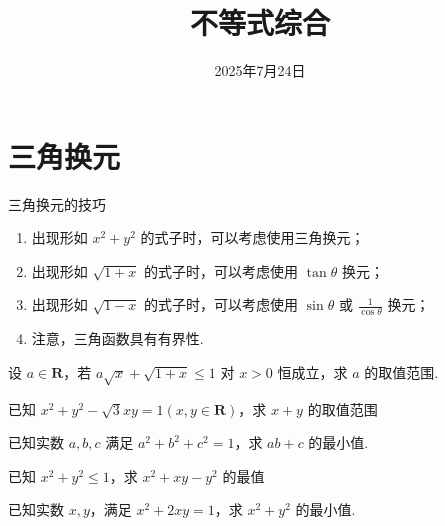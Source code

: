 \documentclass[a4paper , final]{ctexart}
\title{不等式综合}
\date{2025年7月24日}
\newenvironment{problem}[1]{%
  \item #1
  \par
  \vspace{8cm}
}{}
\begin{document}
\maketitle

\section*{三角换元}

三角换元的技巧
\begin{enumerate}
  \item 出现形如 $x^2+y^2$ 的式子时，可以考虑使用三角换元；
  \item 出现形如 $\sqrt{1+x}$ 的式子时，可以考虑使用 $\tan\theta$ 换元；
  \item 出现形如 $\sqrt{1-x}$ 的式子时，可以考虑使用 $\sin\theta$ 或 $\frac{1}{\cos\theta}$ 换元；
  \item  注意，三角函数具有有界性.
\end{enumerate}

\begin{problems}
  \begin{problem}
    {
      设 $a\in\mathbf{R}$，若 $a\sqrt{x}+\sqrt{1+x}\leq 1$ 对 $x>0$ 恒成立，求 $a$ 的取值范围.
    }
  \end{problem}

  \begin{problem}
    {
      已知 $x^2+y^2-\sqrt{3}xy = 1(x,y\in\mathbf{R})$，求 $x+y$ 的取值范围
    }
  \end{problem}
\newpage
  \begin{problem}
    {
      已知实数 $a,b,c$ 满足 $a^2+b^2+c^2=1$，求 $ab+c$ 的最小值.
    }
  \end{problem}

  \begin{problem}
    {
      已知 $x^2+y^2\leq 1$，求 $x^2+xy-y^2$ 的最值
    }
  \end{problem}

  \begin{problem}
    {
      已知实数 $x,y$，满足 $x^2+2xy=1$，求 $x^2+y^2$ 的最小值.
    }
  \end{problem}
\end{problems}
\end{document}
